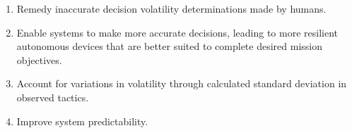 \documentclass{article}
\begin{document}
\begin{enumerate}[noitemsep]
	\item Remedy inaccurate decision volatility determinations made by humans.
    \item Enable systems to make more accurate decisions, leading to more resilient autonomous devices that are better suited to complete desired mission objectives.
    \item Account for variations in volatility through calculated standard deviation in observed tactics.
	\item Improve system predictability.


\end{enumerate}
\end{document}
